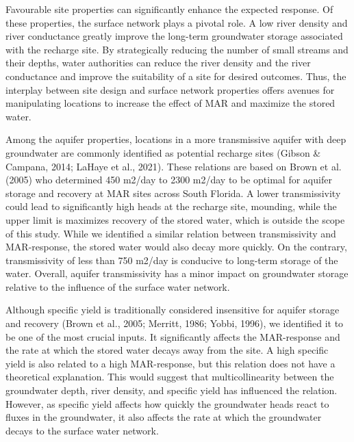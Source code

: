 \documentclass[
]{agujournal2019}
\begin{document}
Favourable site properties can significantly enhance the expected
response. Of these properties, the surface network plays a pivotal role.
A low river density and river conductance greatly improve the long-term
groundwater storage associated with the recharge site. By strategically
reducing the number of small streams and their depths, water authorities
can reduce the river density and the river conductance and improve the
suitability of a site for desired outcomes. Thus, the interplay between
site design and surface network properties offers avenues for
manipulating locations to increase the effect of MAR and maximize the
stored water.

Among the aquifer properties, locations in a more transmissive aquifer
with deep groundwater are commonly identified as potential recharge
sites (Gibson \& Campana, 2014; LaHaye et al., 2021). These relations
are based on Brown et al. (2005) who determined 450 m2/day to 2300
m2/day to be optimal for aquifer storage and recovery at MAR sites
across South Florida. A lower transmissivity could lead to significantly
high heads at the recharge site, mounding, while the upper limit is
maximizes recovery of the stored water, which is outside the scope of
this study. While we identified a similar relation between
transmissivity and MAR-response, the stored water would also decay more
quickly. On the contrary, transmissivity of less than 750 m2/day is
conducive to long-term storage of the water. Overall, aquifer
transmissivity has a minor impact on groundwater storage relative to the
influence of the surface water network.

Although specific yield is traditionally considered insensitive for
aquifer storage and recovery (Brown et al., 2005; Merritt, 1986; Yobbi,
1996), we identified it to be one of the most crucial inputs. It
significantly affects the MAR-response and the rate at which the stored
water decays away from the site. A high specific yield is also related
to a high MAR-response, but this relation does not have a theoretical
explanation. This would suggest that multicollinearity between the
groundwater depth, river density, and specific yield has influenced the
relation. However, as specific yield affects how quickly the groundwater
heads react to fluxes in the groundwater, it also affects the rate at
which the groundwater decays to the surface water network.
\end{document}

